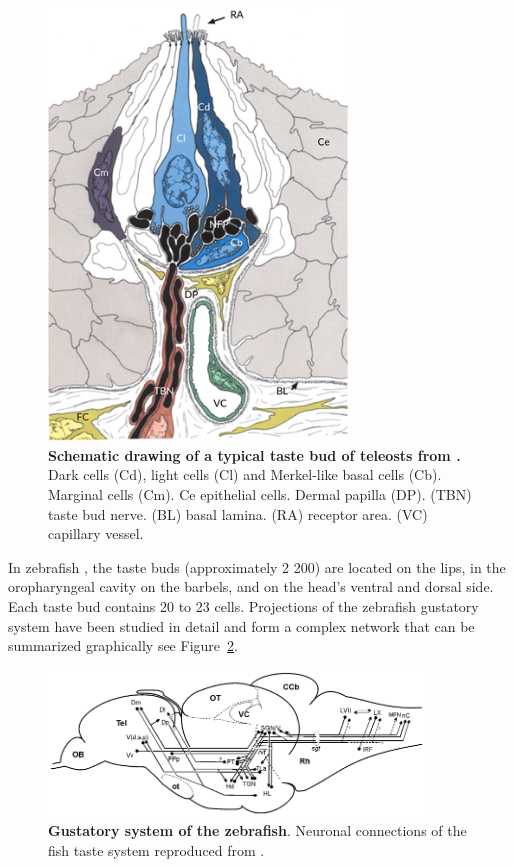     \begin{figure}[h]
      \centering
      \includegraphics[width=8cm]{part_2/assets/gustatory_schematic.png}
      \caption{\textbf{Schematic drawing of a typical taste bud of teleosts from \cite{hansen2002taste}.} Dark cells (Cd), light cells (Cl) and Merkel‐like basal cells (Cb). Marginal cells (Cm). Ce epithelial cells. Dermal papilla (DP). (TBN) taste bud nerve. (BL) basal lamina. (RA) receptor area. (VC) capillary vessel.}
      \label{gustatory_schematic}
    \end{figure}

    In zebrafish \cite{ohkubo2005distribution}, the taste buds (approximately 2 200) are located on the lips, in the oropharyngeal cavity on the barbels, and on the head's ventral and dorsal side. Each taste bud contains 20 to 23 cells. Projections of the zebrafish gustatory system have been studied in detail \cite{yanez2017gustatory} and form a complex network that can be summarized graphically see Figure~\ref{gustatory_connection_schematic}.

    \begin{figure}[h]
      \centering
      \includegraphics[width=10cm]{part_2/assets/gustatory_connection_schematic.png}
      \caption{\textbf{Gustatory system of the zebrafish}. Neuronal connections of the fish taste system reproduced from \cite{yanez2017gustatory}.}
      \label{gustatory_connection_schematic}
    \end{figure}

